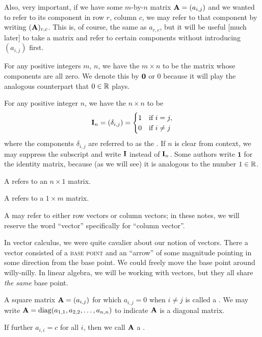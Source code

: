 Also, very important, if we have some $m$-by-$n$ matrix
$\mathbf{A}=(a_{i,j})$ and we wanted to refer to its component in row $r$,
column $c$, we may refer to that component by writing $(\mathbf{A})_{r,c}$.
This is, of course, the same as $a_{r,c}$, but it will be useful [much
later] to take a matrix and refer to certain components without
introducing $(a_{i,j})$ first.

For any positive integers $m$, $n$, we have the $m\times n$ 
to be the matrix whose components are all zero. We denote this by
$\mathbf{0}$ or $0$
because it will play the analogous counterpart that $0\in\mathbb{R}$ plays. 

For any positive integer $n$, we have the $n\times n$ 
to be
\begin{equation}
  \mathbf{I}_{n} = (\delta_{i,j}) = \begin{cases}1 &\mbox{if }i=j,\\
    0 &\mbox{if }i\neq j
  \end{cases}
\end{equation}
where the components $\delta_{i,j}$ are referred to as the
. If $n$ is clear from context, we may suppress
the subscript and write $\mathbf{I}$ instead of $\mathbf{I}_{n}$. Some authors write
$\mathbf{1}$ for the identity matrix, because (as we will see) it is
analogous to the number $1\in\mathbb{R}$.

\begin{definition}
A  refers to an $n\times1$ matrix.

A  refers to a $1\times m$ matrix.

A  may refer to either row vectors or column vectors; in
these notes, we will reserve the word ``vector'' specifically for
``column vector''.
\end{definition}

\begin{ddanger}
In vector calculus, we were quite cavalier about our notion of vectors. 
There a vector consisted of a \textsc{base point} and an ``arrow''
of some magnitude pointing in some direction from the base point. We
could freely move the base point around willy-nilly. In linear algebra,
we will be working with vectors, but they all share \emph{the same} base
point. 
\end{ddanger}

\begin{definition}
A square matrix $\mathbf{A}=(a_{i,j})$ for which $a_{i,j}=0$ when $i\neq j$ is
called a . We may write
$\mathbf{A}=\operatorname{diag}(a_{1,1}, a_{2,2},\dots, a_{n,n})$ to indicate $\mathbf{A}$
is a diagonal matrix. 

If further $a_{i,i}=c$ for all $i$, then we call $\mathbf{A}$ a
. 
\end{definition}

